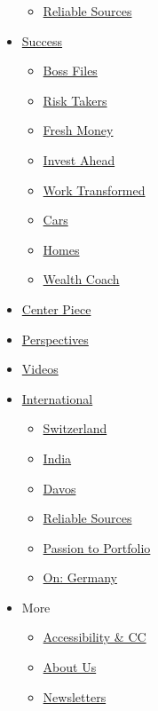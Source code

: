 \begin{itemize}
  \begin{itemize}
  \tightlist
  \item
    \href{/shows/reliable-sources}{Reliable Sources}
  \end{itemize}
\item
  \href{/business/success}{Success}

  \begin{itemize}
  \tightlist
  \item
    \href{/specials/success/boss-files}{Boss Files}
  \item
    \href{/interactive/2019/business/risk-takers}{Risk Takers}
  \item
    \href{/specials/success/fresh-money}{Fresh Money}
  \item
    \href{/specials/success/invest-ahead}{Invest Ahead}
  \item
    \href{/specials/tech/work-transformed}{Work Transformed}
  \item
    \href{/business/cars}{Cars}
  \item
    \href{/business/homes}{Homes}
  \item
    \href{/specials/success/wealth-coach}{Wealth Coach}
  \end{itemize}
\item
  \href{/specials/business/center-piece}{Center Piece}
\item
  \href{/business/perspectives}{Perspectives}
\item
  \href{/business/videos}{Videos}
\item
  \href{https://edition.cnn.com/business}{International}

  \begin{itemize}
  \tightlist
  \item
    \href{https://www.cnnmoney.ch}{Switzerland}
  \item
    \href{/business/india}{India}
  \item
    \href{/specials/business/davos/}{Davos}
  \item
    \href{/shows/reliable-sources}{Reliable Sources}
  \item
    \href{/specials/business/passion-to-portfolio}{Passion to Portfolio}
  \item
    \href{/specials/business/on-germany}{On: Germany}
  \end{itemize}
\item
  More

  \begin{itemize}
  \tightlist
  \item
    \href{/accessibility}{Accessibility \& CC}
  \item
    \href{/about}{About Us}
  \item
    \href{/newsletters}{Newsletters}
  \end{itemize}
\end{itemize}

